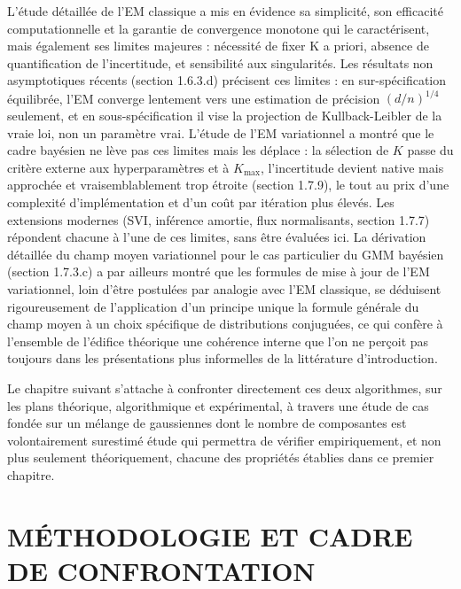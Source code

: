 L'étude détaillée de l'EM classique a mis en évidence sa simplicité, son efficacité computationnelle et la garantie de convergence monotone qui le caractérisent, mais également ses limites majeures : nécessité de fixer K a priori, absence de quantification de l'incertitude, et sensibilité aux singularités. Les résultats non asymptotiques récents (section 1.6.3.d) précisent ces limites : en sur-spécification équilibrée, l'EM converge lentement vers une estimation de précision $(d/n)^{1/4}$ seulement, et en sous-spécification il vise la projection de Kullback-Leibler de la vraie loi, non un paramètre vrai. L'étude de l'EM variationnel a montré que le cadre bayésien ne lève pas ces limites mais les déplace : la sélection de $K$ passe du critère externe aux hyperparamètres et à $K_{\max}$, l'incertitude devient native mais approchée et vraisemblablement trop étroite (section 1.7.9), le tout au prix d'une complexité d'implémentation et d'un coût par itération plus élevés. Les extensions modernes (SVI, inférence amortie, flux normalisants, section 1.7.7) répondent chacune à l'une de ces limites, sans être évaluées ici. La dérivation détaillée du champ moyen variationnel pour le cas particulier du GMM bayésien (section 1.7.3.c) a par ailleurs montré que les formules de mise à jour de l'EM variationnel, loin d'être postulées par analogie avec l'EM classique, se déduisent rigoureusement de l'application d'un principe unique  la formule générale du champ moyen  à un choix spécifique de distributions conjuguées, ce qui confère à l'ensemble de l'édifice théorique une cohérence interne que l'on ne perçoit pas toujours dans les présentations plus informelles de la littérature d'introduction.

Le chapitre suivant s'attache à confronter directement ces deux algorithmes, sur les plans théorique, algorithmique et expérimental, à travers une étude de cas fondée sur un mélange de gaussiennes dont le nombre de composantes est volontairement surestimé  étude qui permettra de vérifier empiriquement, et non plus seulement théoriquement, chacune des propriétés établies dans ce premier chapitre.


\part{MÉTHODOLOGIE ET CADRE DE CONFRONTATION}

